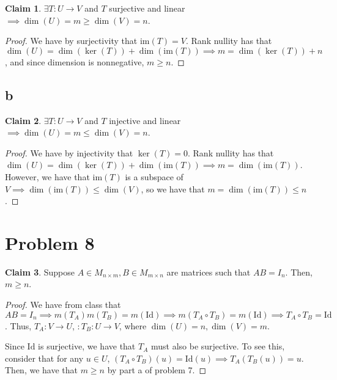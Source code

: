 \documentclass[12pt,letterpaper]{article}
\theoremstyle{definition}
\newtheorem*{claim}{Claim}
\newcommand{\id}{\mathrm{Id}}
\newcommand{\im}{\mathrm{im}}
\begin{document}
\begin{claim}
  $\exists T: U \rightarrow V$ and $T$ surjective and linear $\implies \dim(U) = m \geq
  \dim(V) = n$.
\end{claim}

\begin{proof}
  We have by surjectivity that $\im(T) = V$. Rank nullity has that $\dim(U) =
  \dim(\ker(T)) + \dim(\im(T)) \implies m = \dim(\ker(T)) + n$, and since
  dimension is nonnegative, $m \geq n$.
\end{proof}

\subsection*{b}

\begin{claim}
  $\exists T: U \rightarrow V$ and $T$ injective and linear $\implies \dim(U) = m \leq
  \dim(V) = n$.
\end{claim}

\begin{proof}
  We have by injectivity that $\ker(T) = {0}$. Rank nullity has that $\dim(U) =
  \dim(\ker(T)) + \dim(\im(T)) \implies m = \dim(\im(T))$. However, we have that
  $\im(T)$ is a subspace of $V \implies \dim(\im(T)) \leq \dim(V)$, so we have
  that $m = \dim(\im(T)) \leq n$.
\end{proof}


\section*{Problem 8}

\begin{claim}
  Suppose $A \in M_{n \times m}, B \in M_{m \times n}$ are matrices such that
  $AB = I_n$. Then, $m \geq n$.
\end{claim}

\begin{proof}
  We have from class that $AB = I_n \implies m(T_A)m(T_B) = m(\id) \implies
  m(T_A \circ T_B) = m(\id) \implies T_A \circ T_B = \id$. Thus, $T_A: V
  \rightarrow U$, $:T_B: U \rightarrow V$, where $\dim(U) = n, \dim(V) = m$.

  Since $\id$ is surjective, we have that $T_A$ must also be surjective.
  To see this, consider that for any $u \in U$, $(T_A \circ T_B)(u) = \id(u)
  \implies T_A(T_B(u)) = u$. Then, we have that $m \geq n$ by part a of
  problem 7.
\end{proof}
\end{document}
